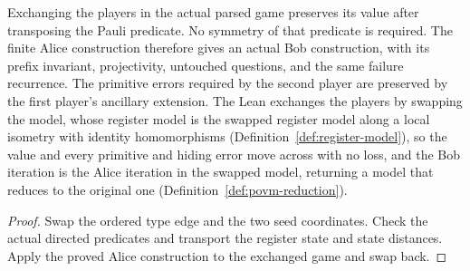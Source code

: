 \begin{lemma}
\label{lem:intro-bob-iteration}
\leanok
Exchanging the players in the actual parsed game preserves its value after
transposing the Pauli predicate. No symmetry of that predicate is required.
The finite Alice construction therefore gives an actual Bob construction,
with its prefix invariant, projectivity, untouched questions, and the same
failure recurrence. The primitive errors required by the second player
are preserved by the first player's ancillary extension.
The Lean exchanges the players by swapping the model, whose register model is the swapped register
model along a local isometry with identity homomorphisms (Definition~\ref{def:register-model}),
so the value and every primitive and hiding error move across with no loss, and the Bob iteration
is the Alice iteration in the swapped model, returning a model that reduces to the original one
(Definition~\ref{def:povm-reduction}).
\end{lemma}
\begin{proof}
\leanok
Swap the ordered type edge and the two seed coordinates. Check the actual
directed predicates and transport the register state and state distances.
Apply the proved Alice construction to the exchanged game and swap back.
\end{proof}

